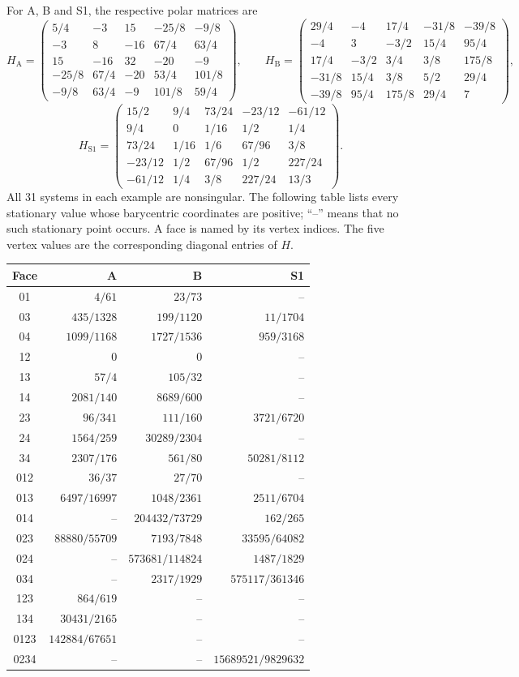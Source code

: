 For A, B and S1, the respective polar matrices are
\begingroup\small
\[
H_{\mathrm A}=\begin{pmatrix}
5/4&-3&15&-25/8&-9/8\\
-3&8&-16&67/4&63/4\\
15&-16&32&-20&-9\\
-25/8&67/4&-20&53/4&101/8\\
-9/8&63/4&-9&101/8&59/4
\end{pmatrix},\qquad
H_{\mathrm B}=\begin{pmatrix}
29/4&-4&17/4&-31/8&-39/8\\
-4&3&-3/2&15/4&95/4\\
17/4&-3/2&3/4&3/8&175/8\\
-31/8&15/4&3/8&5/2&29/4\\
-39/8&95/4&175/8&29/4&7
\end{pmatrix},
\]
\[
H_{\mathrm{S1}}=\begin{pmatrix}
15/2&9/4&73/24&-23/12&-61/12\\
9/4&0&1/16&1/2&1/4\\
73/24&1/16&1/6&67/96&3/8\\
-23/12&1/2&67/96&1/2&227/24\\
-61/12&1/4&3/8&227/24&13/3
\end{pmatrix}.
\]
\endgroup
All 31 systems in each example are nonsingular. The following table
lists every stationary value whose barycentric coordinates are positive;
``--'' means that no such stationary point occurs. A face is named by
its vertex indices. The five vertex values are the corresponding diagonal
entries of $H$.
\begin{center}\small
\begin{tabular}{c r r r}
\toprule
Face & A & B & S1\\\midrule
01&$4/61$&$23/73$&--\\
03&$435/1328$&$199/1120$&$11/1704$\\
04&$1099/1168$&$1727/1536$&$959/3168$\\
12&$0$&$0$&--\\
13&$57/4$&$105/32$&--\\
14&$2081/140$&$8689/600$&--\\
23&$96/341$&$111/160$&$3721/6720$\\
24&$1564/259$&$30289/2304$&--\\
34&$2307/176$&$561/80$&$50281/8112$\\
012&$36/37$&$27/70$&--\\
013&$6497/16997$&$1048/2361$&$2511/6704$\\
014&--&$204432/73729$&$162/265$\\
023&$88880/55709$&$7193/7848$&$33595/64082$\\
024&--&$573681/114824$&$1487/1829$\\
034&--&$2317/1929$&$575117/361346$\\
123&$864/619$&--&--\\
134&$30431/2165$&--&--\\
0123&$142884/67651$&--&--\\
0234&--&--&$15689521/9829632$\\
\bottomrule
\end{tabular}
\end{center}

